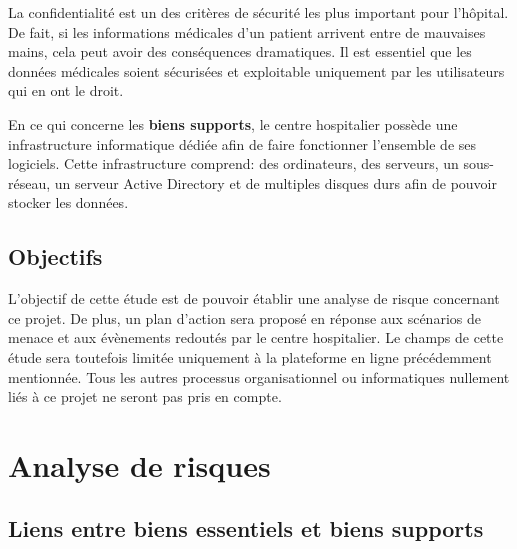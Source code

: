 \documentclass[12pt]{article}
\begin{document}
\justify
La confidentialité est un des critères de sécurité les plus important pour l'hôpital. De fait, si les informations médicales d'un patient arrivent entre de mauvaises mains, cela peut avoir des conséquences dramatiques. Il est essentiel que les données médicales soient sécurisées et exploitable uniquement par les utilisateurs qui en ont le droit.

\justify
En ce qui concerne les \textbf{biens supports}, le centre hospitalier possède une infrastructure informatique dédiée afin de faire fonctionner l'ensemble de ses logiciels. Cette infrastructure comprend: des ordinateurs, des serveurs, un sous-réseau, un serveur Active Directory et de multiples disques durs afin de pouvoir stocker les données.

\subsection{Objectifs}

\justify
L'objectif de cette étude est de pouvoir établir une analyse de risque concernant ce projet. De plus, un plan d'action sera proposé en réponse aux scénarios de menace et aux évènements redoutés par le centre hospitalier. Le champs de cette étude sera toutefois limitée uniquement à la plateforme en ligne précédemment mentionnée. Tous les autres processus organisationnel ou informatiques nullement liés à ce projet ne seront pas pris en compte.

\section{Analyse de risques}

\subsection{Liens entre biens essentiels et biens supports} \label{lien-essentiel-support}
\end{document}
